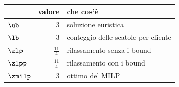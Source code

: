 \begin{center}\small
\begin{tabular}{lrl}
\toprule
 & valore & che cos'è \\
\midrule
$\ub$ & $3$ & soluzione euristica \\
$\lb$ & $3$ & conteggio delle scatole per cliente \\
$\zlp$ & $\frac{11}{4}$ & rilassamento senza i bound \\
$\zlpp$ & $\frac{11}{4}$ & rilassamento con i bound \\
$\zmilp$ & $3$ & ottimo del MILP \\
\bottomrule
\end{tabular}
\end{center}

